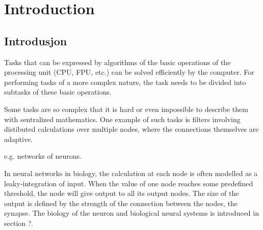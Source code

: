 
\chapter{Introduction} %
\section{Introdusjon}
%


	Tasks that can be expressed by algorithms of the basic operations of the processing unit (CPU, FPU, etc.) can be solved efficiently by the computer.
	For performing tasks of a more complex nature, the task needs to be divided into subtasks of these basic operations.

	Some tasks are so complex that it is hard or even impossible to describe them with sentralized mathematics.
	One example of such tasks is filters involving distibuted calculations over multiple nodes, where the connections themselves are adaptive.

	e.g. networks of neurons.

	In neural networks in biology, the calculation at each node is often modelled as a leaky-integration of input.
	When the value of one node reaches some predefined threshold, the node will give output to all its output nodes.
	The size of the output is defined by the strength of the connection between the nodes, the synapse.
	The biology of the neuron and biological neural systems is introduced in section ?.

